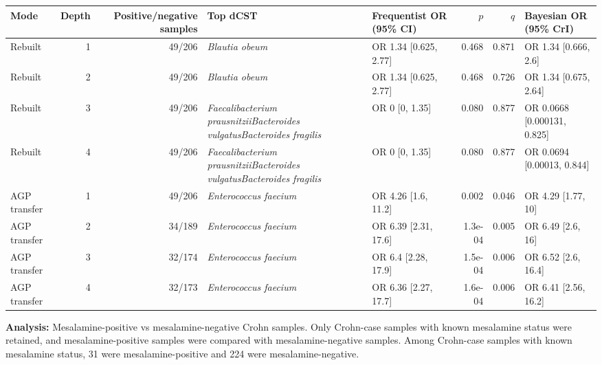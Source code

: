 \begin{center}
\scriptsize
\begin{tabularx}{\textwidth}{@{} l r r Y Y r r Y @{}}
\toprule
Mode & Depth & Positive/negative samples & Top dCST & Frequentist OR (95\% CI) & \(p\) & \(q\) & Bayesian OR (95\% CrI) \\
\midrule
Rebuilt & 1 & 49/206 & \emph{Blautia obeum} & OR 1.34 [0.625, 2.77] & 0.468 & 0.871 & OR 1.34 [0.666, 2.6] \\
Rebuilt & 2 & 49/206 & \emph{Blautia obeum} & OR 1.34 [0.625, 2.77] & 0.468 & 0.726 & OR 1.34 [0.675, 2.64] \\
Rebuilt & 3 & 49/206 & \emph{Faecalibacterium prausnitzii}\dcstsep \emph{Bacteroides vulgatus}\dcstsep \emph{Bacteroides fragilis} & OR 0 [0, 1.35] & 0.080 & 0.877 & OR 0.0668 [0.000131, 0.825] \\
Rebuilt & 4 & 49/206 & \emph{Faecalibacterium prausnitzii}\dcstsep \emph{Bacteroides vulgatus}\dcstsep \emph{Bacteroides fragilis} & OR 0 [0, 1.35] & 0.080 & 0.877 & OR 0.0694 [0.00013, 0.844] \\
AGP transfer & 1 & 49/206 & \emph{Enterococcus faecium} & OR 4.26 [1.6, 11.2] & 0.002 & 0.046 & OR 4.29 [1.77, 10] \\
AGP transfer & 2 & 34/189 & \emph{Enterococcus faecium} & OR 6.39 [2.31, 17.6] & 1.3e-04 & 0.005 & OR 6.49 [2.6, 16] \\
AGP transfer & 3 & 32/174 & \emph{Enterococcus faecium} & OR 6.4 [2.28, 17.9] & 1.5e-04 & 0.006 & OR 6.52 [2.6, 16.4] \\
AGP transfer & 4 & 32/173 & \emph{Enterococcus faecium} & OR 6.36 [2.27, 17.7] & 1.6e-04 & 0.006 & OR 6.41 [2.56, 16.2] \\
\bottomrule
\end{tabularx}
\end{center}
\bigskip

\noindent\textbf{Analysis:} Mesalamine-positive vs mesalamine-negative Crohn samples. Only Crohn-case samples with known mesalamine status were retained, and mesalamine-positive samples were compared with mesalamine-negative samples. Among Crohn-case samples with known mesalamine status, 31 were mesalamine-positive and 224 were mesalamine-negative.

